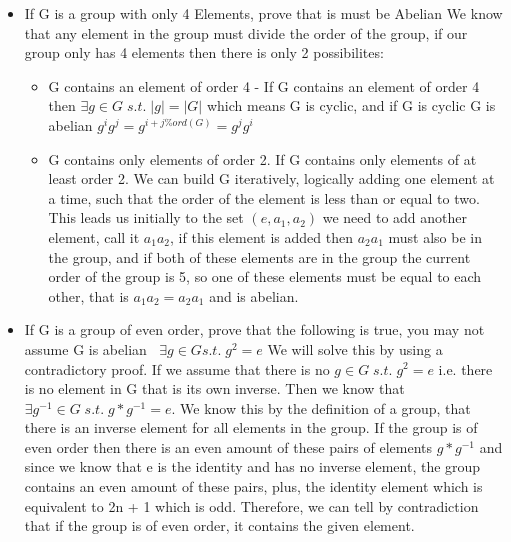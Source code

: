 \documentclass[12pt]{article}
\begin{document}
\begin{enumerate}
\begin{itemize}
    \item If G is a group with only 4 Elements, prove that is must be Abelian
      We know that any element in the group must divide the order of the group, if our group only has 4 elements then there is only 2 possibilites:
      \begin{itemize}
        \item G contains an element of order 4 - If G contains an element of order 4 then $ \exists g \in G \;s.t.\; |g| = |G| $ which means G is cyclic, and if G is cyclic G is abelian $ g^i g^j = g^{i + j \% ord(G) } = g^j g^i $
        \item G contains only elements of order 2.  If G contains only elements of at least order 2.  We can build G iteratively, logically adding one element at a time, such that the order of the element is less than or equal to two.  This leads us initially to the set $ (e, a_1, a_2 )$ we need to add another element, call it $a_1a_2$, if this element is added then $a_2a_1$ must also be in the group, and if both of these elements are in the group the current order of the group is 5, so one of these elements must be equal to each other, that is $a_1a_2 = a_2a_1$ and is abelian.
      \end{itemize}
    \item If G is a group of even order, prove that the following is true, you may not assume G is abelian $ \;\;\exists g \in G s.t. \; g^2 = e $
      We will solve this by using a contradictory proof.  If we assume that there is no $ g \in G \;s.t.\; g^2 = e $ i.e. there is no element in G that is its own inverse.
        Then we know that $ \exists g^{-1} \in G \;s.t.\; g*g^{-1} = e $.  We know this by the definition of a group, that there is an inverse element for all elements in the group.  If the group is of even order then there is an even
        amount of these pairs of elements $g*g^{-1}$ and since we know that e is the identity and has no inverse element, the group contains an even amount of these pairs, plus, the identity element which is equivalent to
        2n + 1 which is odd.  Therefore, we can tell by contradiction that if the group is of even order, it contains the given element. 
    

\end{itemize}
\end{enumerate}
\end{document}
